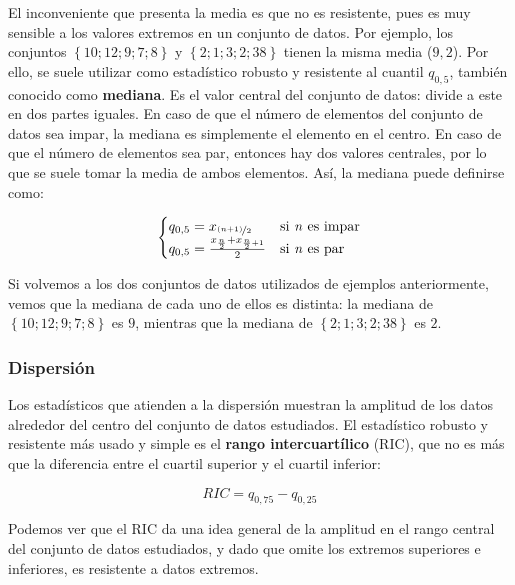 \documentclass[12pt]{article}
\begin{document}
El inconveniente que presenta la media es que no es resistente, pues es muy sensible a los valores extremos en un conjunto de datos. Por ejemplo, los conjuntos $\left\lbrace 10; 12; 9; 7; 8 \right\rbrace$ y $\left\lbrace 2; 1; 3; 2; 38 \right\rbrace$ tienen la misma media ($9,2$). Por ello, se suele utilizar como estadístico robusto y resistente al cuantil $q_{0,5}$, también conocido como \textbf{mediana}. Es el valor central del conjunto de datos: divide a este en dos partes iguales. En caso de que el número de elementos del conjunto de datos sea impar, la mediana es simplemente el elemento en el centro. En caso de que el número de elementos sea par, entonces hay dos valores centrales, por lo que se suele tomar la media de ambos elementos. Así, la mediana puede definirse como:

\begin{equation}
\begin{cases}
q_{0,5} = x_{\nicefrac{(n + 1)}{2}} &\text{si \textit{n} es impar}\\
q_{0,5} = \frac{x_{\frac{n}{2}} + x_{\frac{n}{2} + 1}}{2} &\text{si \textit{n} es par}
\end{cases}
\label{eq:median}
\end{equation}

Si volvemos a los dos conjuntos de datos utilizados de ejemplos anteriormente, vemos que la mediana de cada uno de ellos es distinta: la mediana de $\left\lbrace 10; 12; 9; 7; 8 \right\rbrace$ es $9$, mientras que la mediana de $\left\lbrace 2; 1; 3; 2; 38 \right\rbrace$ es $2$.

\subsubsection{Dispersión}

Los estadísticos que atienden a la dispersión muestran la amplitud de los datos alrededor del centro del conjunto de datos estudiados. El estadístico robusto y resistente más usado y simple es el \textbf{rango intercuartílico} (RIC), que no es más que la diferencia entre el cuartil superior y el cuartil inferior:

\begin{equation}
RIC = q_{0,75} - q_{0,25}
\label{eq:ric}
\end{equation}

Podemos ver que el RIC da una idea general de la amplitud en el rango central del conjunto de datos estudiados, y dado que omite los extremos superiores e inferiores, es resistente a datos extremos.
\end{document}
